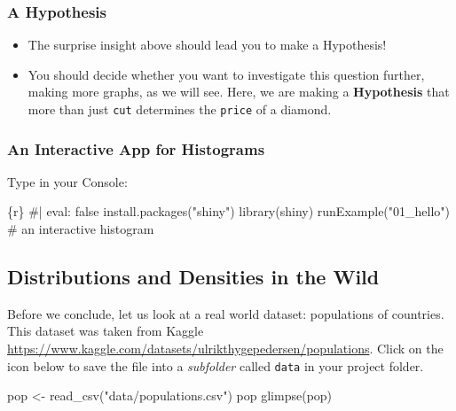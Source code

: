 \documentclass[
  letterpaper,
  DIV=11,
  numbers=noendperiod,
  oneside]{scrartcl}
\newenvironment{Shaded}{\begin{snugshade}}{\end{snugshade}}
\newcommand{\CommentTok}[1]{\textcolor[rgb]{0.37,0.37,0.37}{#1}}
\newcommand{\FunctionTok}[1]{\textcolor[rgb]{0.28,0.35,0.67}{#1}}
\newcommand{\InformationTok}[1]{\textcolor[rgb]{0.37,0.37,0.37}{#1}}
\newcommand{\NormalTok}[1]{\textcolor[rgb]{0.00,0.23,0.31}{#1}}
\newcommand{\OtherTok}[1]{\textcolor[rgb]{0.00,0.23,0.31}{#1}}
\newcommand{\StringTok}[1]{\textcolor[rgb]{0.13,0.47,0.30}{#1}}
\begin{document}
\subsubsection{A Hypothesis}\label{a-hypothesis}

\begin{itemize}
\item
  The surprise insight above should lead you to make a Hypothesis!
\item
  You should decide whether you want to investigate this question
  further, making more graphs, as we will see. Here, we are making a
  \textbf{Hypothesis} that more than just \texttt{cut} determines the
  \texttt{price} of a diamond.
\end{itemize}

\subsubsection{An Interactive App for
Histograms}\label{an-interactive-app-for-histograms}

Type in your Console:

\begin{Shaded}
\begin{Highlighting}[]
\InformationTok{\textasciigrave{}\textasciigrave{}\textasciigrave{}\{r\}}
\CommentTok{\#| eval: false}
\FunctionTok{install.packages}\NormalTok{(}\StringTok{"shiny"}\NormalTok{)}
\FunctionTok{library}\NormalTok{(shiny)}
\FunctionTok{runExample}\NormalTok{(}\StringTok{"01\_hello"}\NormalTok{) }\CommentTok{\# an interactive histogram}
\InformationTok{\textasciigrave{}\textasciigrave{}\textasciigrave{}}
\end{Highlighting}
\end{Shaded}

\subsection{\texorpdfstring{ Distributions and Densities in the
Wild}{ Distributions and Densities in the Wild}}\label{distributions-and-densities-in-the-wild}

Before we conclude, let us look at a real world dataset: populations of
countries. This dataset was taken from Kaggle
\url{https://www.kaggle.com/datasets/ulrikthygepedersen/populations}.
Click on the icon below to save the file into a \emph{subfolder} called
\texttt{data} in your project folder.

\begin{Shaded}
\begin{Highlighting}[]
\NormalTok{pop }\OtherTok{\textless{}{-}} \FunctionTok{read\_csv}\NormalTok{(}\StringTok{"data/populations.csv"}\NormalTok{)}
\NormalTok{pop}
\FunctionTok{glimpse}\NormalTok{(pop)}
\end{Highlighting}
\end{Shaded}
\end{document}
